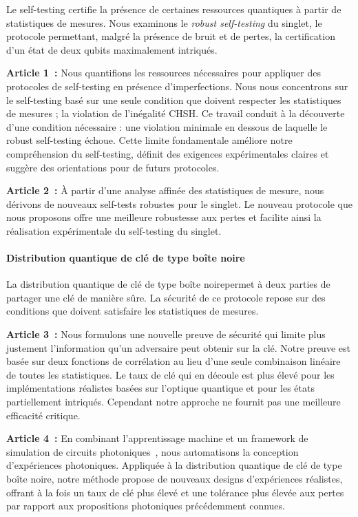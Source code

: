 Le self-testing certifie la présence de certaines ressources quantiques à partir de statistiques de mesures.
Nous examinons le \textit{robust self-testing} du singlet, le protocole permettant, malgré la présence de bruit et de pertes, la certification d'un état de deux qubits maximalement intriqués.

\medbreak

\textbf{Article 1~\cite{Valcarce2020}:} 
Nous quantifions les ressources nécessaires pour appliquer des protocoles de self-testing en présence d'imperfections.
Nous nous concentrons sur le self-testing basé sur une seule condition que doivent respecter les statistiques de mesures ; la violation de l'inégalité CHSH.
Ce travail conduit à la découverte d'une condition nécessaire : une violation minimale en dessous de laquelle le robust self-testing échoue.
Cette limite fondamentale améliore notre compréhension du self-testing, définit des exigences expérimentales claires et suggère des orientations pour de futurs protocoles.

\textbf{Article 2~\cite{Valcarce2022}:} 
À partir d'une analyse affinée des statistiques de mesure, nous dérivons de nouveaux self-tests robustes pour le singlet.
Le nouveau protocole que nous proposons offre une meilleure robustesse aux pertes et facilite ainsi la réalisation expérimentale du self-testing du singlet.

\paragraph{Distribution quantique de clé de type \guillemotleft boîte noire\guillemotright}

La distribution quantique de clé de type \guillemotleft boîte noire\guillemotright permet à deux parties de partager une clé de manière sûre.
La sécurité de ce protocole repose sur des conditions que doivent satisfaire les statistiques de mesures.

\medbreak

\textbf{Article 3~\cite{Sekatski2021}:}
Nous formulons une nouvelle preuve de sécurité qui limite plus justement l'information qu'un adversaire peut obtenir sur la clé.
Notre preuve est basée sur deux fonctions de corrélation au lieu d'une seule combinaison linéaire de toutes les statistiques.
Le taux de clé qui en découle est plus élevé pour les implémentations réalistes basées sur l'optique quantique et pour les états partiellement intriqués. 
Cependant notre approche ne fournit pas une meilleure efficacité critique.

\textbf{Article 4~\cite{Valcarce2022b}:} 
En combinant l'apprentissage machine et un framework de simulation de circuits photoniques~\cite{Valcarce2021}, nous automatisons la conception d'expériences photoniques.
Appliquée à la distribution quantique de clé de type \guillemotleft boîte noire\guillemotright, notre méthode propose de nouveaux designs d'expériences réalistes, offrant à la fois un taux de clé plus élevé et une tolérance plus élevée aux pertes par rapport aux propositions photoniques précédemment connues.

